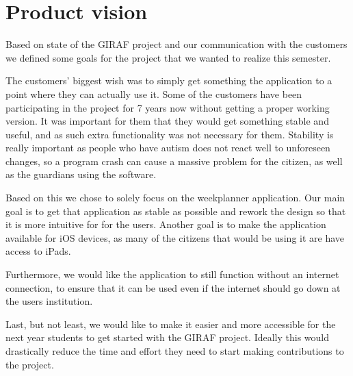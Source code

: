 \section{Product vision}
Based on state of the GIRAF project and our communication with the customers we defined some goals for the project that we wanted to realize this semester.

The customers' biggest wish was to simply get something the application to a point where they can actually use it.
Some of the customers have been participating in the project for 7 years now without getting a proper working version.
It was important for them that they would get something stable and useful, and as such extra functionality was not necessary for them.
Stability is really important as people who have autism does not react well to unforeseen changes, so a program crash can cause a massive problem for the citizen, as well as the guardians using the software.

Based on this we chose to solely focus on the weekplanner application.
Our main goal is to get that application as stable as possible and rework the design so that it is more intuitive for for the users.
Another goal is to make the application available for iOS devices, as many of the citizens that would be using it are have access to iPads.

Furthermore, we would like the application to still function without an internet connection, to ensure that it can be used even if the internet should go down at the users institution.

Last, but not least, we would like to make it easier and more accessible for the next year students to get started with the GIRAF project.
Ideally this would drastically reduce the time and effort they need to start making contributions to the project.